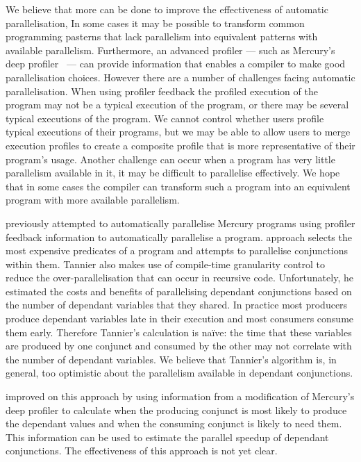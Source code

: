 We believe that more can be done to improve the effectiveness of
automatic parallelisation,
In some cases it may be possible to transform common programming
pasterns that lack parallelism into equivalent patterns with available
parallelism.
Furthermore, an advanced profiler --- such as Mercury's deep
profiler~\citep{conway:2001:mercury-deep} --- can provide information
that enables a compiler to make good parallelisation choices.
However there are a number of challenges facing automatic
parallelisation.
When using profiler feedback the profiled execution of the program may
not be a typical execution of the program, or there may be several
typical executions of the program.
We cannot control whether users profile typical executions of their
programs, but we may be able to allow users to merge execution
profiles to create a composite profile that is more representative of
their program's usage.
Another challenge can occur when a program has very little parallelism
available in it, it may be difficult to parallelise effectively.
We hope that in some cases the compiler can transform such a program
into an equivalent program with more available parallelism.

\citet{tannier:2007:parallel_mercury} previously attempted to automatically
parallelise Mercury programs using profiler feedback
information to automatically parallelise a program.
\citet{tannier:2007:parallel_mercury} approach selects the most expensive predicates
of a program and attempts to parallelise conjunctions within them.
Tannier also makes use of compile-time granularity
control to reduce the over-parallelisation that can occur in recursive
code.
Unfortunately, he estimated the costs and benefits of parallelising
dependant conjunctions based on the number of dependant variables that
they shared.
In practice most producers produce dependant variables late in their
execution and most consumers consume them early.
Therefore Tannier's calculation is na\"ive: the time that these
variables are produced by one conjunct and consumed by the other may
not correlate with the number of dependant variables.
We believe that Tannier's algorithm is, in general, too optimistic
about the parallelism available in dependant conjunctions.

\citet{bone:2008:hons} improved on this approach by using
information from a modification of Mercury's deep profiler to
calculate when the producing conjunct is most likely to produce the
dependant values and when the consuming conjunct is likely to need
them.
This information can be used to estimate the parallel speedup of
dependant conjunctions.
The effectiveness of this approach is not yet clear.

